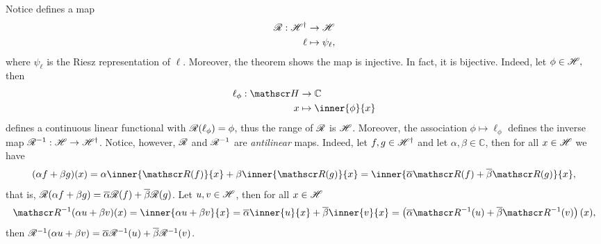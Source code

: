Notice  defines a map
\begin{align*}
    \mathscr{R} : \mathscr{H}^\dag &\to \mathscr{H}\\
                           \ell &\mapsto \psi_\ell,
\end{align*}
where \(\psi_\ell\) is the Riesz representation of \(\ell\). Moreover, the theorem shows the map is injective. In fact, it is bijective. Indeed, let \(\phi \in \mathscr{H},\) then
\begin{align*}
    \ell_\phi : \hilbert &\to \mathbb{C}\\
                       x &\mapsto \inner{\phi}{x}
\end{align*}
defines a continuous linear functional with \(\mathscr{R}(\ell_\phi) = \phi\), thus the range of \(\mathscr{R}\) is \(\mathscr{H}\). Moreover, the association \(\phi\mapsto\ell_\phi\) defines the inverse map \(\mathscr{R}^{-1} : \mathscr{H} \to \mathscr{H}^\dag\). Notice, however, \(\mathscr{R}\) and \(\mathscr{R}^{-1}\) are \emph{antilinear} maps. Indeed, let \(f, g \in \mathscr{H}^\dag\) and let \(\alpha, \beta \in \mathbb{C}\), then for all \(x \in \mathscr{H}\) we have
\begin{equation*}
    (\alpha f + \beta g)(x) = \alpha \inner{\riesz(f)}{x} + \beta \inner{\riesz(g)}{x} = \inner{\conj{\alpha}\riesz(f) + \conj{\beta}\riesz(g)}{x},
\end{equation*}
that is, \(\mathscr{R}(\alpha f + \beta g) = \overline{\alpha}\mathscr{R}(f) + \overline{\beta}\mathscr{R}(g)\).  Let \(u, v \in \mathscr{H}\), then for all \(x \in \mathscr{H}\)
\begin{equation*}
    \riesz^{-1}(\alpha u + \beta v)(x) = \inner{\alpha u + \beta v}{x} = \conj{\alpha} \inner{u}{x} + \conj{\beta}\inner{v}{x} = \left(\conj{\alpha}\riesz^{-1}(u)+ \conj{\beta}\riesz^{-1}(v)\right)(x),
\end{equation*}
then \(\mathscr{R}^{-1}(\alpha u + \beta v) = \overline{\alpha}\mathscr{R}^{-1}(u) + \overline{\beta}\mathscr{R}^{-1}(v)\).

